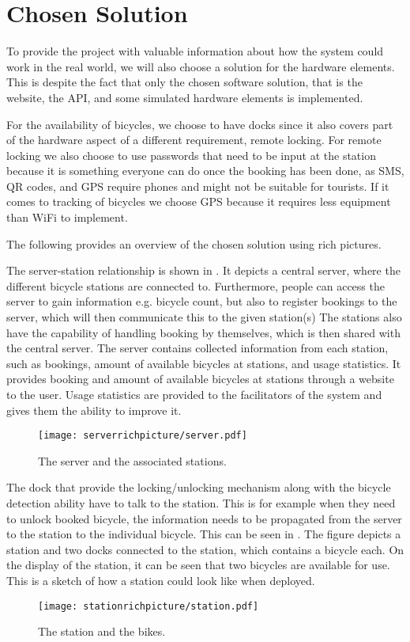 \section{Chosen Solution}
To provide the project with valuable information about how the system could work in the real world, we will also choose a solution for the hardware elements.
This is despite the fact that only the chosen software solution, that is the website, the API, and some simulated hardware elements is implemented.

For the availability of bicycles, we choose to have docks since it also covers part of the hardware aspect of a different requirement, remote locking.  
For remote locking we also choose to use passwords that need to be input at the station because it is something everyone can do once the booking has been done, as SMS, QR codes, and GPS require phones and might not be suitable for tourists.
If it comes to tracking of bicycles we choose GPS because it requires less equipment than WiFi to implement.

The following provides an overview of the chosen solution using rich pictures.

The server-station relationship is shown in .
It depicts a central server, where the different bicycle stations are connected to.
Furthermore, people can access the server to gain information e.g. bicycle count, but also to register bookings to the server, which will then communicate this to the given station(s)
The stations also have the capability of handling booking by themselves, which is then shared with the central server.
The server contains collected information from each station, such as bookings, amount of available bicycles at stations, and usage statistics.
It provides booking and amount of available bicycles at stations through a website to the user. 
Usage statistics are provided to the facilitators of the system and gives them the ability to improve it. 

\begin{figure}[h]
\centering
\texttt{[image: serverrichpicture/server.pdf]}
\caption{The server and the associated stations.}
\label{fig:ServerRichPicture}
\end{figure}

The dock that provide the locking/unlocking mechanism along with the bicycle detection ability have to talk to the station. 
This is for example when they need to unlock booked bicycle, the information needs to be propagated from the server to the station to the individual bicycle.
This can be seen in .
The figure depicts a station and two docks connected to the station, which contains a bicycle each. 
On the display of the station, it can be seen that two bicycles are available for use.
This is a sketch of how a station could look like when deployed.
\begin{figure}[h]
\centering
\texttt{[image: stationrichpicture/station.pdf]}
\caption{The station and the bikes.}
\label{fig:StationRichPicture}
\end{figure}